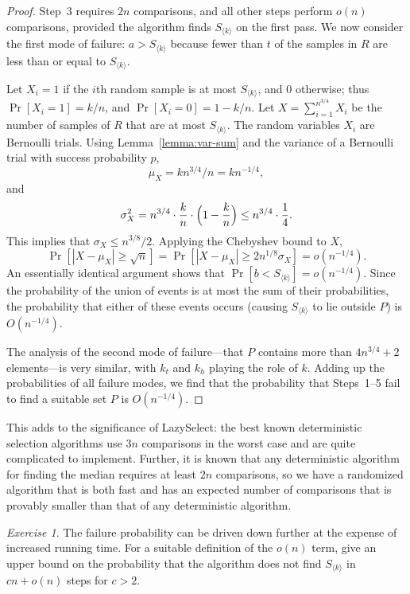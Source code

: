 \documentclass[twoside,12pt]{book}
\theoremstyle{plain}
\theoremstyle{definition}
\theoremstyle{remark}
\newtheorem{exercise}[theorem]{Exercise}
\begin{document}
\begin{proof}
Step~3 requires $2n$ comparisons, and all other steps perform $o(n)$ comparisons, provided the algorithm finds $S_{\langle k \rangle}$ on the first pass. We now consider the first mode of failure: $a > S_{\langle k \rangle}$ because fewer than $t$ of the samples in $R$ are less than or equal to $S_{\langle k \rangle}$.

Let $X_i = 1$ if the $i$th random sample is at most $S_{\langle k \rangle}$, and $0$ otherwise; thus $\Pr[X_i = 1] = k/n$, and $\Pr[X_i = 0] = 1 - k/n$. Let $X = \sum_{i=1}^{n^{3/4}} X_i$ be the number of samples of $R$ that are at most $S_{\langle k \rangle}$. The random variables $X_i$ are Bernoulli trials. Using Lemma~\ref{lemma:var-sum} and the variance of a Bernoulli trial with success probability $p$,
\[
\mu_X = k n^{3/4} / n = k n^{-1/4},
\]
and
\[
\sigma_X^2 = n^{3/4} \cdot \frac{k}{n} \cdot \Bigl(1 - \frac{k}{n}\Bigr) \leq n^{3/4} \cdot \frac{1}{4}.
\]
This implies that $\sigma_X \leq n^{3/8}/2$. Applying the Chebyshev bound to $X$,
\[
\Pr[|X - \mu_X| \geq \sqrt{n}] = \Pr[|X - \mu_X| \geq 2n^{1/8} \sigma_X] = o(n^{-1/4}).
\]
An essentially identical argument shows that $\Pr[b < S_{\langle k \rangle}] = o(n^{-1/4})$. Since the probability of the union of events is at most the sum of their probabilities, the probability that either of these events occurs (causing $S_{\langle k \rangle}$ to lie outside $P$) is $O(n^{-1/4})$.

The analysis of the second mode of failure---that $P$ contains more than $4n^{3/4} + 2$ elements---is very similar, with $k_t$ and $k_h$ playing the role of $k$. Adding up the probabilities of all failure modes, we find that the probability that Steps~1--5 fail to find a suitable set $P$ is $O(n^{-1/4})$.
\end{proof}

This adds to the significance of LazySelect: the best known deterministic selection algorithms use $3n$ comparisons in the worst case and are quite complicated to implement. Further, it is known that any deterministic algorithm for finding the median requires at least $2n$ comparisons, so we have a randomized algorithm that is both fast and has an expected number of comparisons that is provably smaller than that of any deterministic algorithm.

\begin{exercise}
The failure probability can be driven down further at the expense of increased running time. For a suitable definition of the $o(n)$ term, give an upper bound on the probability that the algorithm does not find $S_{\langle k \rangle}$ in $cn + o(n)$ steps for $c > 2$.
\end{exercise}
\end{document}
